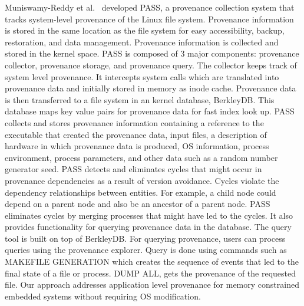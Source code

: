 Muniswamy-Reddy
et al.~\cite{muniswamy_reddy} developed PASS, a provenance collection system that tracks  system-level provenance of the Linux file system. Provenance information
is stored in the same location as the file system for easy accessibility, backup,
restoration, and data management. Provenance information is collected and stored in
the kernel space. PASS is composed of 3 major components: provenance collector, provenance storage, and provenance query. The collector keeps track of system level provenance. It intercepts system calls which are translated into provenance data and initially stored in memory as inode cache. Provenance data is then transferred to a file system in an kernel database, BerkleyDB. This database maps key value pairs for provenance data for fast index look up. PASS collects and stores provenance information containing a reference to the executable that created the provenance data, input files, a description of hardware in which provenance data is produced, OS information, process environment, process parameters, and other data such as a random number generator seed. PASS detects and eliminates cycles that might occur in provenance dependencies as a result of version avoidance. Cycles violate the dependency relationships between entities. For example, a child node could depend on a parent node and also be an ancestor of a parent node. PASS eliminates cycles by merging processes that might have led to the cycles. It also provides functionality for querying provenance data in the database. The query tool is built on top of BerkleyDB. For querying provenance, users can process queries using the provenance explorer. Query is done using commands such as MAKEFILE  GENERATION which creates the sequence of events that led to the final state of a file or process. DUMP ALL, gets the provenance of the requested file. Our approach addresses application level provenance for memory constrained embedded systems without requiring OS modification.


